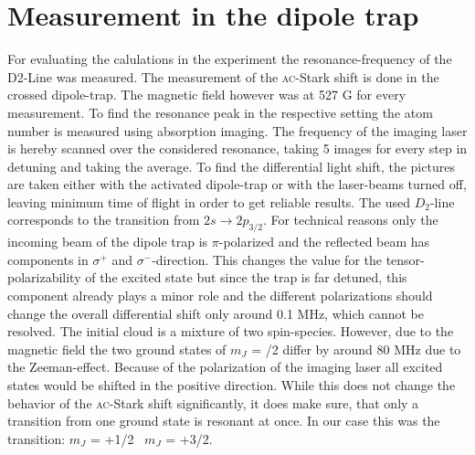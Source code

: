 \chapter{Measurement in the dipole trap}
For evaluating the calulations in the experiment the resonance-frequency of the D2-Line was measured. The measurement of the \textsc{ac}-Stark shift is done in the crossed dipole-trap. The magnetic field however was at 527 G for every measurement. To find the resonance peak in the respective setting the atom number is measured using absorption imaging. The frequency of the imaging laser is hereby scanned over the considered resonance, taking 5 images for every step in detuning and taking the average. To find the differential light shift, the pictures are taken either with the activated dipole-trap or with the laser-beams turned off, leaving minimum time of flight in order to get reliable results. The used $D_2$-line corresponds to the transition from  $2s\rightarrow2p_{3/2}$. For technical reasons only the incoming beam of the dipole trap is $\pi$-polarized and the reflected beam has components in \(\sigma^+\) and \(\sigma^-\)-direction. This changes the value for the tensor-polarizability of the excited state but since the trap is far detuned, this component already plays a minor role and the different polarizations should change the overall differential shift only around 0.1 \footnotesize{MHz}\normalsize, which cannot be resolved. The initial cloud is a mixture of two spin-species. However, due to the magnetic field the two ground states of $m_J$ = /2 differ by around 80 MHz due to the Zeeman-effect. Because of the polarization of the imaging laser all excited states would be shifted in the positive direction. While this does not change the behavior of the \textsc{ac}-Stark shift significantly, it does make sure, that only a transition from one ground state is resonant at once. In our case this was the transition: $m_J$ = +1/2 \rightarrow\ $m_J$ = +3/2. 
